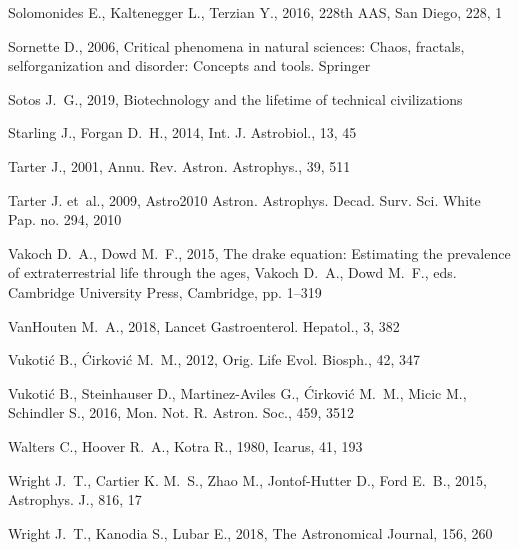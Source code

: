 \documentclass[crop]{CSLB}
\begin{document}
\begin{thebibliography}{90}
Solomonides E., Kaltenegger L., Terzian Y., 2016, 228th AAS, San Diego, 228, 1

Sornette D., 2006, {Critical phenomena in natural sciences: Chaos, fractals,
  selforganization and disorder: Concepts and tools}. Springer

Sotos J.~G., 2019, {Biotechnology and the lifetime of technical civilizations}

Starling J., Forgan D.~H., 2014, Int. J. Astrobiol., 13, 45

Tarter J., 2001, Annu. Rev. Astron. Astrophys., 39, 511

Tarter J. {et~al.}, 2009, Astro2010 Astron. Astrophys. Decad. Surv. Sci. White
  Pap. no. 294, 2010

Vakoch D.~A., Dowd M.~F., 2015, {The drake equation: Estimating the prevalence
  of extraterrestrial life through the ages}, Vakoch D.~A., Dowd M.~F., eds.
  Cambridge University Press, Cambridge, pp. 1--319

VanHouten M.~A., 2018, Lancet Gastroenterol. Hepatol., 3, 382

Vukoti{\'{c}} B., {\'{C}}irkovi{\'{c}} M.~M., 2012, Orig. Life Evol. Biosph.,
  42, 347

Vukoti{\'{c}} B., Steinhauser D., Martinez-Aviles G., {\'{C}}irkovi{\'{c}}
  M.~M., Micic M., Schindler S., 2016, Mon. Not. R. Astron. Soc., 459, 3512

Walters C., Hoover R.~A., Kotra R., 1980, Icarus, 41, 193

Wright J.~T., Cartier K. M.~S., Zhao M., Jontof-Hutter D., Ford E.~B., 2015,
  Astrophys. J., 816, 17

Wright J.~T., Kanodia S., Lubar E., 2018, The Astronomical Journal, 156, 260

\end{thebibliography}
\end{document}
